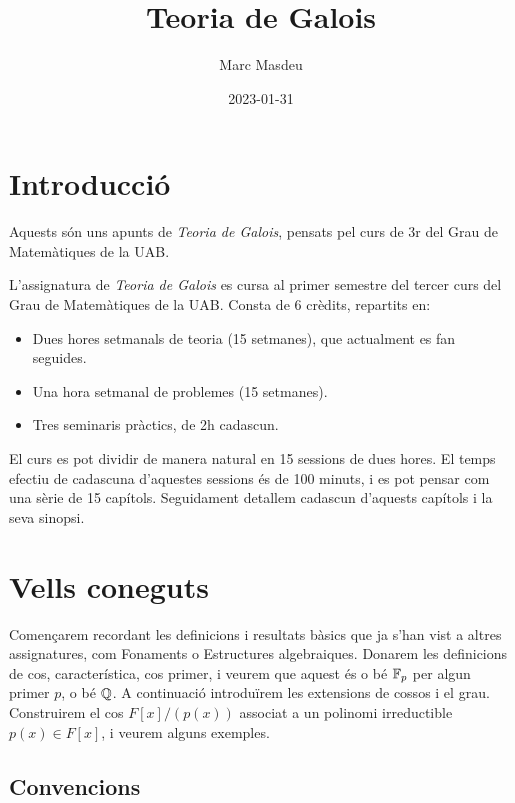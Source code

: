 \documentclass[
]{book}
\title{Teoria de Galois}
\author{Marc Masdeu}
\date{2023-01-31}
\providecommand{\tightlist}{%
  \setlength{\itemsep}{0pt}\setlength{\parskip}{0pt}}
\theoremstyle{definition}
\theoremstyle{definition}
\theoremstyle{definition}
\theoremstyle{definition}
\theoremstyle{remark}
\begin{document}
\maketitle

{
\setcounter{tocdepth}{1}
\tableofcontents
}
\hypertarget{introducciuxf3}{%
\chapter*{Introducció}\label{introducciuxf3}}

Aquests són uns apunts de \emph{Teoria de Galois}, pensats pel curs de 3r del Grau de Matemàtiques de la UAB.

L'assignatura de \emph{Teoria de Galois} es cursa al primer semestre del tercer curs del Grau de Matemàtiques de la UAB. Consta de 6 crèdits, repartits en:

\begin{itemize}
\tightlist
\item
  Dues hores setmanals de teoria (15 setmanes), que actualment es fan seguides.
\item
  Una hora setmanal de problemes (15 setmanes).
\item
  Tres seminaris pràctics, de 2h cadascun.
\end{itemize}

El curs es pot dividir de manera natural en 15 sessions de dues hores. El temps efectiu de cadascuna d'aquestes sessions és de 100 minuts, i es pot pensar com una sèrie de 15 capítols. Seguidament detallem cadascun d'aquests capítols i la seva sinopsi.

\hypertarget{pilot}{%
\chapter{Vells coneguts}\label{pilot}}

Començarem recordant les definicions i resultats bàsics que ja s'han vist a altres
assignatures, com Fonaments o Estructures algebraiques. Donarem les definicions de cos,
característica, cos primer, i veurem que aquest és o bé \(\mathbb{F}_p\) per algun primer \(p\), o bé \(\mathbb{Q}\).
A continuació introduïrem les extensions de cossos i el grau. Construirem el cos \(F[x]/(p(x))\) associat
a un polinomi irreductible \(p(x)\in F[x]\), i veurem alguns exemples.

\hypertarget{convencions}{%
\section{Convencions}\label{convencions}}
\end{document}

